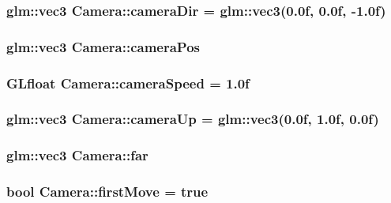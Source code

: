 \subsubsection[{camera\+Dir}]{\setlength{\rightskip}{0pt plus 5cm}glm\+::vec3 Camera\+::camera\+Dir = glm\+::vec3(0.\+0f, 0.\+0f, -\/1.\+0f)}\label{class_camera_ad641b25d477900ac4f3cd859ac14e8f7}
\hypertarget{class_camera_a424bcf971a87506ba6770f2c5c1073f0}{}
\subsubsection[{camera\+Pos}]{\setlength{\rightskip}{0pt plus 5cm}glm\+::vec3 Camera\+::camera\+Pos}\label{class_camera_a424bcf971a87506ba6770f2c5c1073f0}
\hypertarget{class_camera_a8f67cd3183810d8d675d38cc62af966a}{}
\subsubsection[{camera\+Speed}]{\setlength{\rightskip}{0pt plus 5cm}G\+Lfloat Camera\+::camera\+Speed = 1.\+0f}\label{class_camera_a8f67cd3183810d8d675d38cc62af966a}
\hypertarget{class_camera_a517042b127746997f9472d51bbae2610}{}
\subsubsection[{camera\+Up}]{\setlength{\rightskip}{0pt plus 5cm}glm\+::vec3 Camera\+::camera\+Up = glm\+::vec3(0.\+0f, 1.\+0f, 0.\+0f)}\label{class_camera_a517042b127746997f9472d51bbae2610}
\hypertarget{class_camera_a4188ea5916dac6f8a4edae1d0a625326}{}
\subsubsection[{far}]{\setlength{\rightskip}{0pt plus 5cm}glm\+::vec3 Camera\+::far}\label{class_camera_a4188ea5916dac6f8a4edae1d0a625326}
\hypertarget{class_camera_aa4eb398210af281d598297d6a86c6c21}{}
\subsubsection[{first\+Move}]{\setlength{\rightskip}{0pt plus 5cm}bool Camera\+::first\+Move = true}\label{class_camera_aa4eb398210af281d598297d6a86c6c21}
\hypertarget{class_camera_ae10beb7db168af6a6f35d4be223cccf3}{}
